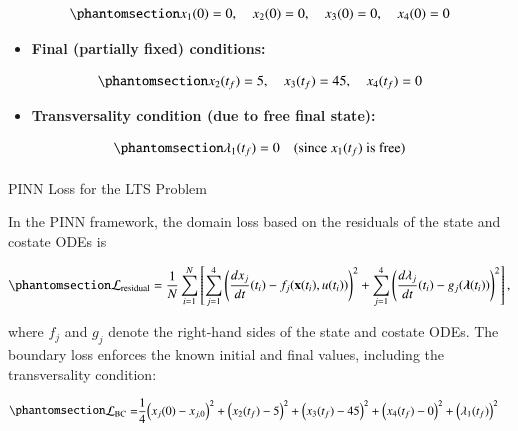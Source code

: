\documentclass[
  number,
  preprint]{elsarticle}
\makeatletter
\let\oldparagraph\paragraph
\renewcommand{\paragraph}{
    \@ifstar
      \xxxParagraphStar
      \xxxParagraphNoStar
  }
\newcommand{\xxxParagraphStar}[1]{\oldparagraph*{#1}\mbox{}}
\newcommand{\xxxParagraphNoStar}[1]{\oldparagraph{#1}\mbox{}}
\providecommand{\tightlist}{%
  \setlength{\itemsep}{0pt}\setlength{\parskip}{0pt}}
\makeatother
\begin{document}
\begin{equation}\protect\phantomsection\label{eq-ch3-lts-ic}{
x_1(0) = 0, \quad x_2(0) = 0, \quad x_3(0) = 0, \quad x_4(0) = 0
}\end{equation}

\begin{itemize}
\tightlist
\item
  \textbf{Final (partially fixed) conditions:}
\end{itemize}

\begin{equation}\protect\phantomsection\label{eq-ch3-lts-fc}{
x_2(t_f) = 5, \quad x_3(t_f) = 45, \quad x_4(t_f) = 0
}\end{equation}

\begin{itemize}
\tightlist
\item
  \textbf{Transversality condition (due to free final state):}
\end{itemize}

\begin{equation}\protect\phantomsection\label{eq-ch3-lts-transversality}{
\lambda_1(t_f) = 0 \quad \text{(since } x_1(t_f) \text{ is free)}
}\end{equation}

\paragraph{PINN Loss for the LTS
Problem}\label{pinn-loss-for-the-lts-problem}

In the PINN framework, the domain loss based on the residuals of the
state and costate ODEs is

\begin{equation}\protect\phantomsection\label{eq-ch3-lts-domain-loss}{
\mathcal{L}_{\text{residual}} = \frac{1}{N}\sum_{i=1}^{N} \left[ 
\sum_{j=1}^{4} \left( \frac{d x_j}{d t}(t_i) - f_j(\mathbf{x}(t_i), u(t_i)) \right)^2 
+ \sum_{j=1}^{4} \left( \frac{d \lambda_j}{d t}(t_i) - g_j(\boldsymbol{\lambda}(t_i)) \right)^2 
\right],
}\end{equation}

where \(f_j\) and \(g_j\) denote the right-hand sides of the state and
costate ODEs. The boundary loss enforces the known initial and final
values, including the transversality condition:

\begin{equation}\protect\phantomsection\label{eq-ch3-lts-bc-loss}{
\begin{aligned}
\mathcal{L}_{\text{BC}} = &\frac{1}{4} {\left( x_j(0) - x_{j,0} \right)^2 
+ \left( x_2(t_f) - 5 \right)^2 
+ \left( x_3(t_f) - 45 \right)^2 
+ \left( x_4(t_f) - 0 \right)^2 
+ \left( \lambda_1(t_f) \right)^2}
\end{aligned}
}\end{equation}
\end{document}
